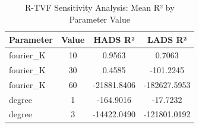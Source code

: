 \begin{table}[h]
\centering
\caption{R-TVF Sensitivity Analysis: Mean R² by Parameter Value}
\label{tab:sensitivity}
\begin{tabular}{lccc}
\toprule
Parameter & Value & HADS R² & LADS R² \\
\midrule
fourier_K & 10 & 0.9563 & 0.7063 \\
fourier_K & 30 & 0.4585 & -101.2245 \\
fourier_K & 60 & -21881.8406 & -182627.5953 \\
\midrule
degree & 1 & -164.9016 & -17.7232 \\
degree & 3 & -14422.0490 & -121801.0192 \\
\bottomrule
\end{tabular}
\end{table}